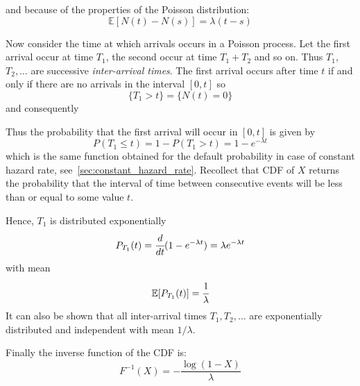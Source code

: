 and because of the properties of the Poisson distribution:
\begin{equation}
\mathbb{E}[N(t)-N(s)]=\lambda (t-s)
\end{equation}

Now consider the time at which arrivals occurs in a Poisson process. Let the first arrival occur at time $T_1$, the second occur at time $T_1 + T_2$ and so on. Thus $T_1$, $T_2, \ldots$ are successive \emph{inter-arrival times}. The first arrival occurs after time $t$ if and only if there are no arrivals in the interval $[0,t]$ so 
\begin{equation}
\{T_1>t\}=\{N(t)=0\}
\end{equation}
and consequently
\begin{equation}
\end{equation}

Thus the probability that the first arrival will occur in $[0,t]$ is given by
\begin{equation}
P(T_1\le t)= 1-P(T_1>t)=1-e^{-\lambda t}
\end{equation}
which is the same function obtained for the default probability in case of constant hazard rate, see~\ref{sec:constant_hazard_rate}.
Recollect that CDF of $X$ returns the probability that the interval of time between consecutive events will be less than or equal to some value $t$.

Hence, $T_1$ is distributed exponentially
\begin{equation}
P_{T_1}(t) = \cfrac{d}{dt}(1-e^{-\lambda t}) = \lambda e^{-\lambda t}
\end{equation}
with mean  
\begin{equation}
\mathbb{E}[P_{T_1}(t)] = \cfrac{1}{\lambda}
\end{equation}
It can also be shown that all inter-arrival times $T_1, T_2,\ldots$ are exponentially distributed and independent with mean $1/\lambda$.

Finally the inverse function of the CDF is:
\begin{equation}
	F^{-1}(X) = -\frac{\log(1-X)}{\lambda}
\end{equation}

